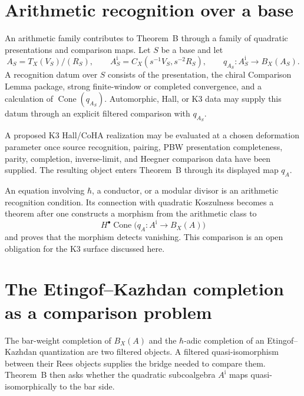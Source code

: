 \section{Arithmetic recognition over a base}
\label{sec:tbsp-supplement}

An arithmetic family contributes to Theorem~B through a family of
quadratic presentations and comparison maps.  Let \(S\) be a base and
let
\[
 A_S=T_X(V_S)/(R_S),\qquad
 A_S^{\mathrm i}=C_X(s^{-1}V_S,s^{-2}R_S),\qquad
 q_{A_S}\colon A_S^{\mathrm i}\longrightarrow B_X(A_S).
\]
A recognition datum over \(S\) consists of the presentation, the chiral
Comparison Lemma package, strong finite-window or completed
convergence, and a calculation of
\(\operatorname{Cone}(q_{A_S})\).  Automorphic, Hall, or K3 data may
supply this datum through an explicit filtered comparison
with \(q_{A_S}\).

\begin{remark}
\label{rem:tbsp-1-ii}
A proposed K3 Hall/CoHA realization may be evaluated at a chosen
deformation parameter once source recognition, pairing,
PBW presentation completeness, parity, completion, inverse-limit, and
Heegner comparison data have been supplied.  The resulting object
enters Theorem~B through its displayed map \(q_A\).
\end{remark}

\begin{remark}
\label{rem:tbsp-2-ii}
An equation involving \(\hbar\), a conductor, or a modular divisor is
an arithmetic recognition condition.  Its connection with quadratic
Koszulness becomes a theorem after one constructs a morphism from the
arithmetic class to
\[
 H^\bullet\operatorname{Cone}
 \bigl(q_A\colon A^{\mathrm i}\to B_X(A)\bigr)
\]
and proves that the morphism detects vanishing.  This comparison is
an open obligation for the K3 surface discussed here.
\end{remark}

\section{The Etingof--Kazhdan completion as a comparison problem}
\label{sec:tbsp-etingof}

\begin{remark}
\label{rem:tbsp-etingof-1}
The bar-weight completion of \(B_X(A)\) and the
\(\hbar\)-adic completion of an Etingof--Kazhdan quantization are two
filtered objects.  A filtered quasi-isomorphism between their Rees
objects supplies the bridge needed to compare them.  Theorem~B then
asks whether the quadratic subcoalgebra \(A^{\mathrm i}\) maps
quasi-isomorphically to the bar side.
\end{remark}

